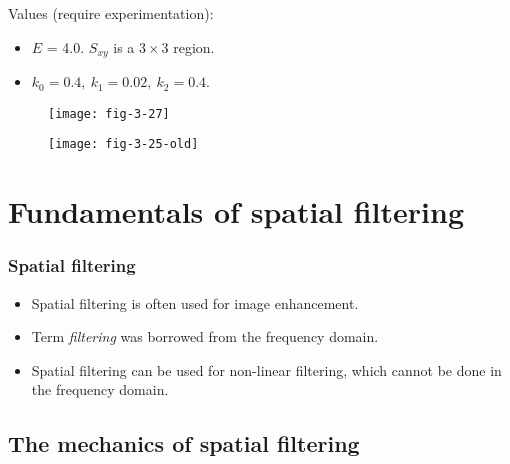
\begin{frame}
Values (require experimentation):
\begin{itemize}
\item $E$ = 4.0. $S_{xy}$ is a $3\times 3$ region.
\item $k_{0} = 0.4,\ k_{1} = 0.02,\ k_{2}= 0.4$.
\end{itemize}
\begin{figure}
\centering
\texttt{[image: fig-3-27]}
\end{figure}
\end{frame}


\begin{frame}
\begin{figure}
\centering
\texttt{[image: fig-3-25-old]}
\end{figure}
\end{frame}


\section{Fundamentals of spatial filtering}


\begin{frame}
\frametitle{Spatial filtering}
\begin{itemize}
\item Spatial filtering is often used for image enhancement.
\item Term \textit{filtering} was borrowed from the frequency domain.
\item Spatial filtering can be used for non-linear filtering, which cannot be done in the frequency domain.
\end{itemize}
\end{frame}


\subsection{The mechanics of spatial filtering}

